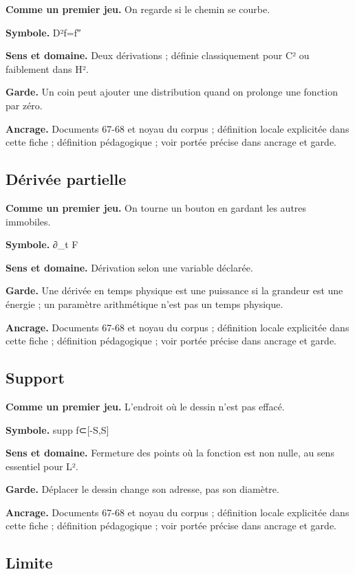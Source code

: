 \documentclass[
  9pt,
  a4paper,
]{article}
\begin{document}
\textbf{Comme un premier jeu.} On regarde si le chemin se courbe.

\textbf{Symbole.} D²f=f″

\textbf{Sens et domaine.} Deux dérivations ; définie classiquement pour
C² ou faiblement dans H².

\textbf{Garde.} Un coin peut ajouter une distribution quand on prolonge
une fonction par zéro.

\textbf{Ancrage.} Documents 67-68 et noyau du corpus ; définition locale
explicitée dans cette fiche ; définition pédagogique ; voir portée
précise dans ancrage et garde.

\hypertarget{duxe9rivuxe9e-partielle}{%
\subsection{Dérivée partielle}\label{duxe9rivuxe9e-partielle}}

\textbf{Comme un premier jeu.} On tourne un bouton en gardant les autres
immobiles.

\textbf{Symbole.} ∂\_t F

\textbf{Sens et domaine.} Dérivation selon une variable déclarée.

\textbf{Garde.} Une dérivée en temps physique est une puissance si la
grandeur est une énergie ; un paramètre arithmétique n'est pas un temps
physique.

\textbf{Ancrage.} Documents 67-68 et noyau du corpus ; définition locale
explicitée dans cette fiche ; définition pédagogique ; voir portée
précise dans ancrage et garde.

\hypertarget{support}{%
\subsection{Support}\label{support}}

\textbf{Comme un premier jeu.} L'endroit où le dessin n'est pas effacé.

\textbf{Symbole.} supp f⊂{[}-S,S{]}

\textbf{Sens et domaine.} Fermeture des points où la fonction est non
nulle, au sens essentiel pour L².

\textbf{Garde.} Déplacer le dessin change son adresse, pas son diamètre.

\textbf{Ancrage.} Documents 67-68 et noyau du corpus ; définition locale
explicitée dans cette fiche ; définition pédagogique ; voir portée
précise dans ancrage et garde.

\hypertarget{limite}{%
\subsection{Limite}\label{limite}}
\end{document}
